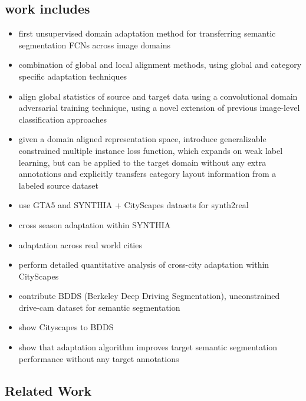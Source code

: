 \subsection{work includes}
\begin{itemize}
	\item first unsupervised domain adaptation method for transferring semantic segmentation FCNs across image domains
	\item combination of global and local alignment methods, using global and category specific adaptation techniques
	\item align global statistics of source and target data using a convolutional domain adversarial training technique, using a novel extension of previous image-level classification approaches 
	\item given a domain aligned representation space, introduce generalizable constrained multiple instance loss function, which expands on weak label learning, but can be applied to the target domain without any extra annotations and explicitly transfers category layout information from a labeled source dataset
	\item use GTA5 and SYNTHIA + CityScapes datasets for synth2real
	\item cross season adaptation within SYNTHIA
	\item adaptation across real world cities
	\item perform detailed quantitative analysis of cross-city adaptation within CityScapes
	\item contribute BDDS (Berkeley Deep Driving Segmentation), unconstrained drive-cam dataset for semantic segmentation
	\item show Cityscapes to BDDS
	\item show that adaptation algorithm improves target semantic segmentation performance without any target annotations
\end{itemize}

\subsection{Related Work}

